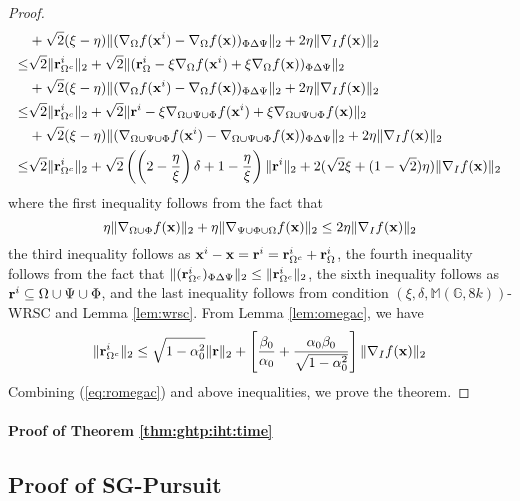 \documentclass{article}
\begin{document}
\begin{proof}
\begin{align*}
&+\sqrt{2}(\xi-\eta)\|(\nabla_{\Omega}f({\bf x}^i)-\nabla_{\Omega} f({\bf x}))_{\Phi\Delta\Psi}\|_2+2\eta\|\nabla_I f({\bf x})\|_2\\
\leq&\sqrt{2}\|{\bf r}_{\Omega^c}^i\|_2+\sqrt{2}\|({\bf r}_{\Omega}^i-\xi\nabla_{\Omega}f({\bf x}^i)+\xi\nabla_{\Omega} f({\bf x}))_{\Phi\Delta\Psi}\|_2\\
&+\sqrt{2}(\xi-\eta)\|(\nabla_{\Omega}f({\bf x}^i)-\nabla_{\Omega} f({\bf x}))_{\Phi\Delta\Psi}\|_2+2\eta\|\nabla_I f({\bf x})\|_2\\
\leq&\sqrt{2}\|{\bf r}_{\Omega^c}^i\|_2+\sqrt{2}\|{\bf r}^i-\xi\nabla_{\Omega\cup\Psi\cup\Phi}f({\bf x}^i)+\xi\nabla_{\Omega\cup\Psi\cup\Phi}f({\bf x})\|_2\\
&+\sqrt{2}(\xi-\eta)\|(\nabla_{\Omega\cup\Psi\cup\Phi} f({\bf x}^i)-\nabla_{\Omega\cup\Psi\cup\Phi}f({\bf x}))_{\Phi\Delta\Psi}\|_2+2\eta\|\nabla_I f({\bf x})\|_2\\
\leq&\sqrt{2}\|{\bf r}_{\Omega^c}^i\|_2+\sqrt{2}\left(\left(2-\frac{\eta}{\xi} \right)\delta+1-\frac{\eta}{\xi} \right)\|{\bf r}^i\|_2+2(\sqrt{2}\xi+(1-\sqrt{2})\eta)\|\nabla_I f({\bf x})\|_2
\end{align*}
where the first inequality follows from the fact that
\textcolor{red}{
\[
\eta\|\nabla_{\Omega\cup\Phi}f({\bf x})\|_2+\eta\|\nabla_{\Psi\cup\Phi\cup\Omega}f({\bf x})\|_2\leq2\eta\|\nabla_I f({\bf x})\|_2
\]
}
the third inequality follows as ${\bf x}^i-{\bf x}={\bf r}^i={\bf r}_{\Omega^c}^i+{\bf r}_{\Omega}^i$, the fourth inequality follows from the fact that $\|({\bf r}_{\Omega^c}^i)_{\Phi\Delta\Psi}\|_2\leq\|{\bf r}_{\Omega^c}^i\|_2$, the sixth inequality follows as ${\bf r}^i\subseteq\Omega\cup\Psi\cup\Phi$, and the last inequality follows from condition $(\xi,\delta,\mathbb{M}(\mathbb{G}, 8k))$-WRSC and Lemma \ref{lem:wrsc}. From Lemma \ref{lem:omegac}, we have
\[
\|{\bf r}_{\Omega^c}^i\|_2\leq\sqrt{1-\alpha_0^2}\|{\bf r}\|_2+\left[\frac{\beta_0}{\alpha_0}+\frac{\alpha_0\beta_0}{\sqrt{1-\alpha_0^2}} \right]\|\nabla_I f({\bf x})\|_2
\]
Combining (\ref{eq:romegac}) and above inequalities, we prove the theorem.
\end{proof}

\paragraph{Proof of Theorem \ref{thm:ghtp:iht:time}}

\subsection{Proof of SG-Pursuit}
\end{document}
